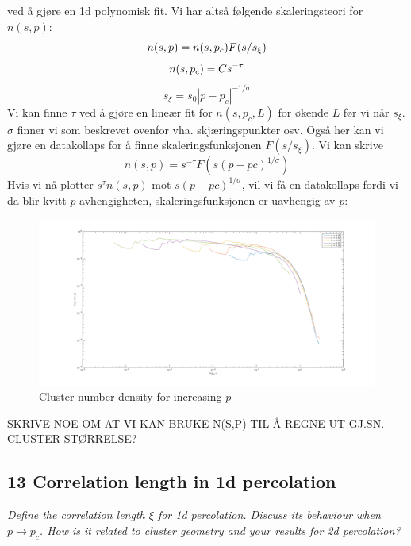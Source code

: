 \documentclass[english, a4paper]{article}
\begin{document}
ved å gjøre en 1d polynomisk fit. Vi har altså følgende skaleringsteori for $n(s,p)$:
\begin{equation}
 n(s,p) = n(s,p_c)F(s/s_\xi) \\
\end{equation}
\begin{equation}
 n(s,p_c) = Cs^{-\tau} \\
\end{equation}
\begin{equation}
 s_\xi = s_0|p-p_c|^{-1/\sigma}
\end{equation}
Vi kan finne $\tau$ ved å gjøre en lineær fit for $n(s,p_c,L)$ for økende $L$ før vi når $s_\xi$. 
$\sigma$ finner vi som beskrevet ovenfor vha. skjæringspunkter osv. Også her kan vi gjøre en datakollaps
for å finne skaleringsfunksjonen $F(s/s_\xi)$. Vi kan skrive
\begin{equation}
 n(s,p) = s^{-\tau}F(s(p-pc)^{1/\sigma})
\end{equation}
Hvis vi nå plotter $s^\tau n(s,p)$ mot $s(p-pc)^{1/\sigma}$, vil vi få en datakollaps fordi
vi da blir kvitt $p$-avhengigheten, skaleringsfunksjonen er uavhengig av $p$:
\begin{figure}[H]
  \begin{center}
  \includegraphics[width = 140mm]{../Figures/cndDataCollapse2d.png}
  \caption{Cluster number density for increasing $p$}
  \label{fig:fig9}
  \end{center}
\end{figure}
SKRIVE NOE OM AT VI KAN BRUKE N(S,P) TIL Å REGNE UT GJ.SN. CLUSTER-STØRRELSE?


\subsection{13 Correlation length in 1d percolation}
\textit{Define the correlation length $\xi$ for 1d percolation. Discuss its behaviour when
$p \to p_c$. How is it related to cluster geometry and your results for 2d percolation?}\\
\end{document}
